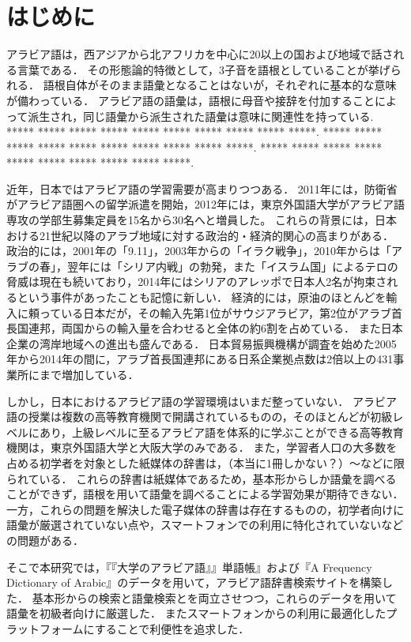 \documentclass[technicalreport]{ieicej}
\begin{document}
\section{はじめに}
アラビア語は，西アジアから北アフリカを中心に20以上の国および地域で話される言葉である．
その形態論的特徴として，3子音を語根としていることが挙げられる．
語根自体がそのまま語彙となることはないが，それぞれに基本的な意味が備わっている．
アラビア語の語彙は，語根に母音や接辞を付加することによって派生され，同じ語彙から派生された語彙は意味に関連性を持っている.
***** ***** ***** ***** ***** ***** ***** ***** ***** *****.
***** ***** ***** ***** ***** ***** ***** ***** ***** *****.
***** ***** ***** ***** ***** ***** ***** ***** ***** *****.

近年，日本ではアラビア語の学習需要が高まりつつある．
2011年には，防衛省がアラビア語圏への留学派遣を開始\cite{nikkei}，2012年には，東京外国語大学がアラビア語専攻の学部生募集定員を15名から30名へと増員した。
これらの背景には，日本おける21世紀以降のアラブ地域に対する政治的・経済的関心の高まりがある．
政治的には，2001年の「9.11」，2003年からの「イラク戦争」，2010年からは「アラブの春」，翌年には「シリア内戦」の勃発，また「イスラム国」によるテロの脅威は現在も続いており，2014年にはシリアのアレッポで日本人2名が拘束されるという事件があったことも記憶に新しい．
経済的には，原油のほとんどを輸入に頼っている日本だが，その輸入先第1位がサウジアラビア，第2位がアラブ首長国連邦，両国からの輸入量を合わせると全体の約6割を占めている\cite{teikoku}．
また日本企業の湾岸地域への進出も盛んである．
日本貿易振興機構が調査を始めた2005年から2014年の間に，アラブ首長国連邦にある日系企業拠点数は2倍以上の431事業所にまで増加している\cite{jetro}．

しかし，日本におけるアラビア語の学習環境はいまだ整っていない．
アラビア語の授業は複数の高等教育機関で開講されているものの，そのほとんどが初級レベルにあり，上級レベルに至るアラビア語を体系的に学ぶことができる高等教育機関は，東京外国語大学と大阪大学のみである．
また，学習者人口の大多数を占める初学者を対象とした紙媒体の辞書は，（本当に1冊しかない？）〜などに限られている．
これらの辞書は紙媒体であるため，基本形からしか語彙を調べることができず，語根を用いて語彙を調べることによる学習効果が期待できない．
一方，これらの問題を解決した電子媒体の辞書は存在するものの，初学者向けに語彙が厳選されていない点や，スマートフォンでの利用に特化されていないなどの問題がある．

そこで本研究では，『『大学のアラビア語』』単語帳』および『A Frequency Dictionary of Arabic』のデータを用いて，アラビア語辞書検索サイトを構築した．
基本形からの検索と語彙検索とを両立させつつ，これらのデータを用いて語彙を初級者向けに厳選した．
またスマートフォンからの利用に最適化したプラットフォームにすることで利便性を追求した．
\end{document}
